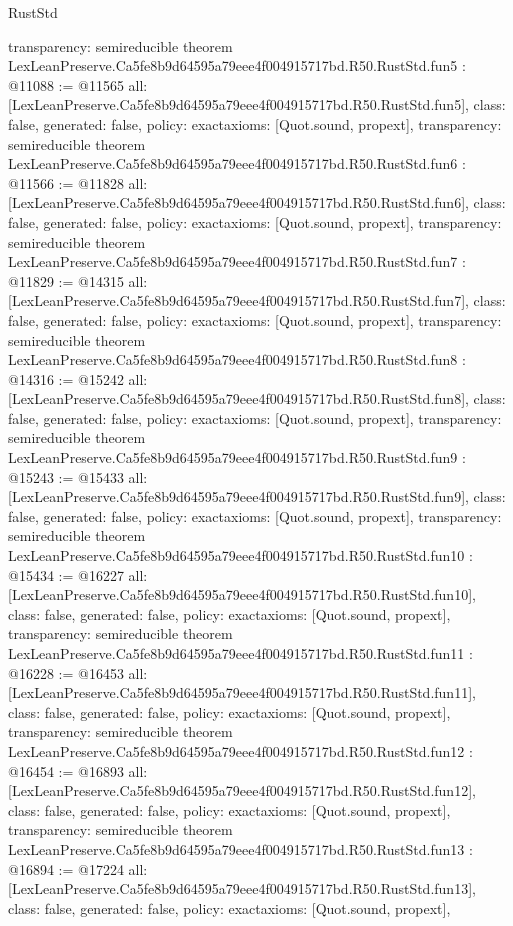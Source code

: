 \begin{lexlean}{RustStd}
\begin{coremodule}
{  transparency: semireducible
}
theorem LexLeanPreserve.Ca5fe8b9d64595a79eee4f004915717bd.R50.RustStd.fun5 : @11088 := @11565 {
  all: [LexLeanPreserve.Ca5fe8b9d64595a79eee4f004915717bd.R50.RustStd.fun5],
  class: false,
  generated: false,
  policy: exact{axioms: [Quot.sound, propext]},
  transparency: semireducible
}
theorem LexLeanPreserve.Ca5fe8b9d64595a79eee4f004915717bd.R50.RustStd.fun6 : @11566 := @11828 {
  all: [LexLeanPreserve.Ca5fe8b9d64595a79eee4f004915717bd.R50.RustStd.fun6],
  class: false,
  generated: false,
  policy: exact{axioms: [Quot.sound, propext]},
  transparency: semireducible
}
theorem LexLeanPreserve.Ca5fe8b9d64595a79eee4f004915717bd.R50.RustStd.fun7 : @11829 := @14315 {
  all: [LexLeanPreserve.Ca5fe8b9d64595a79eee4f004915717bd.R50.RustStd.fun7],
  class: false,
  generated: false,
  policy: exact{axioms: [Quot.sound, propext]},
  transparency: semireducible
}
theorem LexLeanPreserve.Ca5fe8b9d64595a79eee4f004915717bd.R50.RustStd.fun8 : @14316 := @15242 {
  all: [LexLeanPreserve.Ca5fe8b9d64595a79eee4f004915717bd.R50.RustStd.fun8],
  class: false,
  generated: false,
  policy: exact{axioms: [Quot.sound, propext]},
  transparency: semireducible
}
theorem LexLeanPreserve.Ca5fe8b9d64595a79eee4f004915717bd.R50.RustStd.fun9 : @15243 := @15433 {
  all: [LexLeanPreserve.Ca5fe8b9d64595a79eee4f004915717bd.R50.RustStd.fun9],
  class: false,
  generated: false,
  policy: exact{axioms: [Quot.sound, propext]},
  transparency: semireducible
}
theorem LexLeanPreserve.Ca5fe8b9d64595a79eee4f004915717bd.R50.RustStd.fun10 : @15434 := @16227 {
  all: [LexLeanPreserve.Ca5fe8b9d64595a79eee4f004915717bd.R50.RustStd.fun10],
  class: false,
  generated: false,
  policy: exact{axioms: [Quot.sound, propext]},
  transparency: semireducible
}
theorem LexLeanPreserve.Ca5fe8b9d64595a79eee4f004915717bd.R50.RustStd.fun11 : @16228 := @16453 {
  all: [LexLeanPreserve.Ca5fe8b9d64595a79eee4f004915717bd.R50.RustStd.fun11],
  class: false,
  generated: false,
  policy: exact{axioms: [Quot.sound, propext]},
  transparency: semireducible
}
theorem LexLeanPreserve.Ca5fe8b9d64595a79eee4f004915717bd.R50.RustStd.fun12 : @16454 := @16893 {
  all: [LexLeanPreserve.Ca5fe8b9d64595a79eee4f004915717bd.R50.RustStd.fun12],
  class: false,
  generated: false,
  policy: exact{axioms: [Quot.sound, propext]},
  transparency: semireducible
}
theorem LexLeanPreserve.Ca5fe8b9d64595a79eee4f004915717bd.R50.RustStd.fun13 : @16894 := @17224 {
  all: [LexLeanPreserve.Ca5fe8b9d64595a79eee4f004915717bd.R50.RustStd.fun13],
  class: false,
  generated: false,
  policy: exact{axioms: [Quot.sound, propext]},
}
\end{coremodule}
\end{lexlean}
